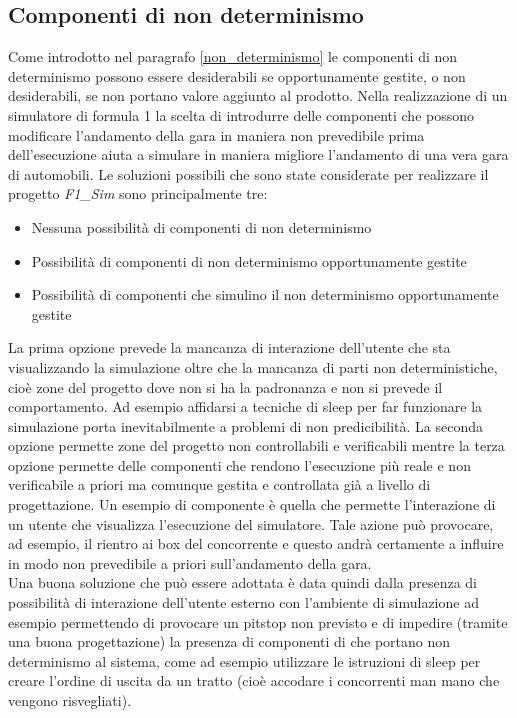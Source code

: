 \subsection{Componenti di non determinismo }
\label{componenti_non_determinismo}
Come introdotto nel paragrafo \ref{non_determinismo} le componenti di non
determinismo possono essere desiderabili se opportunamente gestite, o non
desiderabili, se non portano valore aggiunto al prodotto. Nella realizzazione di
un simulatore di formula 1 la scelta di introdurre delle componenti che possono
modificare l'andamento della gara in maniera non prevedibile prima
dell'esecuzione aiuta a simulare in maniera migliore l'andamento di una vera
gara di automobili. Le soluzioni possibili che sono state considerate per
realizzare il progetto \emph{F1\_Sim} sono principalmente tre:
\begin{itemize}
\item Nessuna possibilit\`{a} di componenti di non determinismo
\item Possibilit\`{a} di componenti di non determinismo opportunamente gestite
\item Possibilit\`{a} di componenti che simulino il non determinismo
opportunamente gestite
\end{itemize}
La prima opzione prevede la mancanza di interazione dell'utente che sta
visualizzando la simulazione oltre che la mancanza di parti non deterministiche,
cioè zone del progetto dove non si ha la padronanza e non si prevede il
comportamento. Ad esempio affidarsi a tecniche di sleep per far funzionare la
simulazione porta inevitabilmente a problemi di non predicibilit\`{a}. La
seconda opzione permette zone del progetto non controllabili e verificabili
mentre la terza opzione permette delle componenti che rendono l'esecuzione
pi\`{u} reale e non verificabile a priori ma comunque gestita e controllata
gi\`{a} a livello di progettazione. Un esempio di componente è quella che
permette l'interazione di un utente che visualizza l'esecuzione del simulatore.
Tale azione pu\`{o} provocare, ad esempio, il rientro ai box del concorrente e
questo andr\`{a} certamente a influire in modo non prevedibile a priori
sull'andamento della gara.\\
Una buona soluzione che pu\`{o} essere adottata è data quindi dalla presenza di
possibilit\`{a} di interazione dell'utente esterno con l'ambiente di simulazione
ad esempio permettendo di provocare un pitstop non previsto e di impedire
(tramite una buona progettazione) la presenza di componenti di che portano non
determinismo al sistema, come ad esempio utilizzare le istruzioni di sleep per
creare l'ordine di uscita da un tratto (cioè accodare i concorrenti man mano che
vengono risvegliati).
